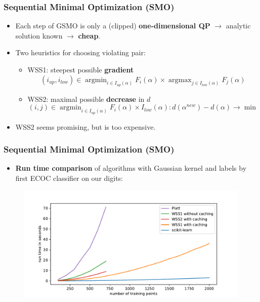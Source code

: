 \documentclass[12pt, compress]{beamer}
\newcommand{\titleC}{Sequential Minimal Optimization (SMO)}
\DeclareMathOperator{\argmax}{argmax}
\DeclareMathOperator{\argmin}{argmin}
\begin{document}
\begin{frame}
\frametitle{\titleC}
\begin{itemize}
	\item Each step of GSMO is only a (clipped) \textbf{\alert{one-dimensional QP}} $\rightarrow$ analytic solution known $\rightarrow$ \textbf{\alert{cheap}}.
	\item Two heuristics for choosing violating pair: \\
	\begin{itemize}
		\item WSS1: steepest possible \textbf{\alert{gradient}}
		\[
		(i_{up},i_{low}) \in \argmin_{i \in I_{up}(\alpha)}F_i(\alpha) \times \argmax_{j \in I_{low}(\alpha)}F_j(\alpha)
		\]
		\item WSS2: maximal possible \textbf{\alert{decrease}} in $d$
		\[
		(i,j) \in \argmin_{i \in I_{up}(\alpha)}F_i(\alpha) \times I_{low}(\alpha): d(\alpha^{new}) - d(\alpha) \rightarrow \min
		\]
		
	\end{itemize}
	\item WSS2 seems promising, but is too expensive.
\end{itemize}
\end{frame}

\begin{frame}
	\frametitle{\titleC}
	
		\begin{itemize}
		\item \textbf{\alert{Run time comparison}} of algorithms with Gaussian kernel and labels by first ECOC classifier on our digits:
		\end{itemize}

	\begin{figure}[h]
	\includegraphics[width=1\textwidth]{images_for_presentation/benchplot_gauss.pdf}
	\end{figure}

\end{frame}
\end{document}

